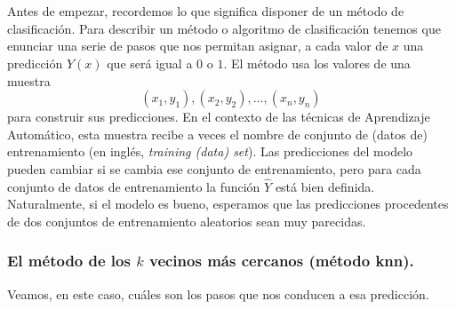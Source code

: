 Antes de empezar, recordemos lo que significa disponer de un método de clasificación. Para describir un método o algoritmo de clasificación tenemos que enunciar una serie de pasos que nos permitan asignar, a cada valor de $x$ una predicción $\hat Y(x)$ que será igual a $0$ o $1$.   El método usa los valores de una muestra
\[
(x_1, y_1), (x_2, y_2), \ldots, (x_n, y_n)
\]
para construir sus predicciones. En el  contexto de las técnicas de Aprendizaje Automático, esta muestra recibe a veces el nombre de {\sf conjunto de (datos de) entrenamiento} (en inglés, {\em training (data) set}). Las predicciones del modelo pueden cambiar si se cambia ese conjunto de entrenamiento, pero para cada conjunto de datos de entrenamiento la función $\hat Y$ está bien definida. Naturalmente, si el modelo es bueno, esperamos que las predicciones procedentes de dos conjuntos de entrenamiento aleatorios sean muy parecidas.

\subsubsection*{El método de los $k$ vecinos más cercanos (método knn).}

Veamos, en este caso, cuáles son los pasos que nos conducen a esa predicción.

